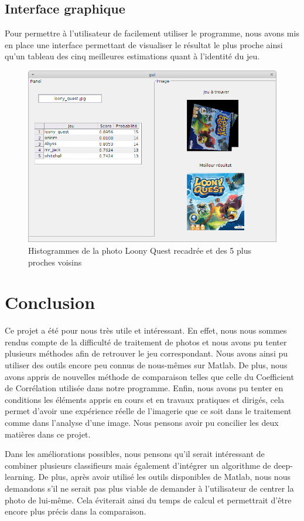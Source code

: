 \documentclass{st50_template}
\begin{document}
\subsection{Interface graphique}
Pour permettre à l'utilisateur de facilement utiliser le programme, nous avons mis en place une interface permettant de visualiser le résultat le plus proche ainsi qu'un tableau des cinq meilleures estimations quant à l'identité du jeu.

\begin{figure}[ht]
    \centering
    \includegraphics[width=\textwidth]{images/interface.png}
    \caption{Histogrammes de la photo Loony Quest recadrée et des 5 plus proches voisins}
    \label{interface}
\end{figure}


\section{Conclusion}

Ce projet a été pour nous très utile et intéressant. En effet, nous nous sommes rendus compte de la difficulté de traitement de photos et nous avons pu tenter plusieurs méthodes afin de retrouver le jeu correspondant. Nous avons ainsi pu utiliser des outils encore peu connus de nous-mêmes sur Matlab. De plus, nous avons appris de nouvelles méthode de comparaison telles que celle du Coefficient de Corrélation utilisée dans notre programme. Enfin, nous avons pu tenter en conditions les éléments appris en cours et en travaux pratiques et dirigés, cela permet d'avoir une expérience réelle de l'imagerie que ce soit dans le traitement comme dans l'analyse d'une image. Nous pensons avoir pu concilier les deux matières dans ce projet.

Dans les améliorations possibles, nous pensons qu'il serait intéressant de combiner plusieurs classifieurs mais également d'intégrer un algorithme de deep-learning. De plus, après avoir utilisé les outils disponibles de Matlab, nous nous demandons s'il ne serait pas plus viable de demander à l'utilisateur de centrer la photo de lui-même. Cela éviterait ainsi du temps de calcul et permettrait d'être encore plus précis dans la comparaison.
\end{document}
